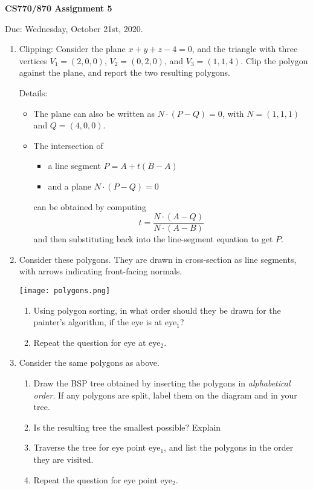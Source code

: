 \documentclass[12pt Times]{article}
\begin{document}
\large

\begin{centering}
{\bf CS770/870  Assignment 5}
\end{centering}

\vspace{0.5cm}

\noindent Due: Wednesday, October 21st, 2020.


\begin{enumerate}
\item Clipping: Consider the plane $x + y + z - 4 = 0$, and the
  triangle with three vertices $V_1=(2, 0, 0)$, $V_2=(0, 2, 0)$, and
  $V_3=(1, 1, 4)$.  Clip the polygon against the plane, and report the
  two resulting polygons.

  Details:
  \begin{itemize}
    \item The plane can also be written as $N\cdot(P - Q)=0$, with
      $N=(1, 1, 1)$ and $Q=(4, 0, 0)$.
    \item The intersection of
      \begin{itemize}
        \item  a line segment $P = A + t(B - A)$
        \item and a plane $N\cdot(P - Q)=0$
      \end{itemize}
      can be obtained by computing
      \[t = \frac{N\cdot(A-Q)}{N\cdot(A-B)}\]
      and then substituting back into the line-segment equation to get $P$.
  \end{itemize}

\item Consider these polygons.  They are drawn in cross-section as line
  segments, with arrows indicating front-facing normals.

  \texttt{[image: polygons.png]}
  \begin{enumerate}
    \item Using polygon sorting, in what order should they be drawn
      for the painter's algorithm, if the eye is at eye${}_1$?
    \item Repeat the question for eye at eye${}_2$.
  \end{enumerate}

\item Consider the same polygons as above.
  \begin{enumerate}
  \item Draw the BSP tree obtained by inserting the polygons in
    {\it alphabetical order}.  If any polygons are split, label them on the
    diagram and in your tree.
  \item Is the resulting tree the smallest possible?  Explain
  \item Traverse the tree for eye point eye${}_1$, and list the
    polygons in the order they are visited.
  \item Repeat the question for eye point eye${}_2$.
  \end{enumerate}


\end{enumerate}
\end{document}
